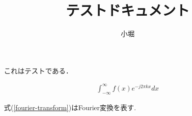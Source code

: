 \documentclass{jsarticle}
\title{テストドキュメント}
\author{小堀}p
\begin{document}
\maketitle

これはテストである．

\begin{eqnarray}
    \label{fourier-transform}
    \int_{-\infty}^{\infty} f(x) e^{-j2\pi kx} dx
\end{eqnarray}

式(\ref{fourier-transform})はFourier変換を表す.
\end{document}
